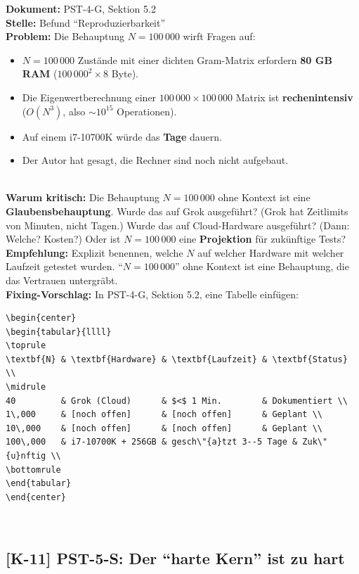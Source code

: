 \documentclass[11pt,a4paper]{article}
\newcommand{\K}[1]{\textbf{[K-#1]}}
\newcommand{\Dok}[1]{\textbf{Dokument:} #1\\}
\newcommand{\Stelle}[1]{\textbf{Stelle:} #1\\}
\newcommand{\Prob}[1]{\textbf{Problem:} #1\\}
\newcommand{\Krit}[1]{\textbf{Warum kritisch:} #1\\}
\newcommand{\Empf}[1]{\textbf{Empfehlung:} #1\\}
\newcommand{\Fix}[1]{\textbf{Fixing-Vorschlag:} #1\\}
\begin{document}
\Dok{PST-4-G, Sektion 5.2}
\Stelle{Befund ``Reproduzierbarkeit''}
\Prob{Die Behauptung $N = 100\,000$ wirft Fragen auf:
\begin{itemize}
  \item $N = 100\,000$ Zust\"{a}nde mit einer dichten Gram-Matrix
    erfordern \textbf{80 GB RAM} ($100\,000^2 \times 8$ Byte).
  \item Die Eigenwertberechnung einer $100\,000 \times 100\,000$
    Matrix ist \textbf{rechenintensiv} ($O(N^3)$, also $\sim 10^{15}$
    Operationen).
  \item Auf einem i7-10700K w\"{u}rde das \textbf{Tage} dauern.
  \item Der Autor hat gesagt, die Rechner sind noch nicht aufgebaut.
\end{itemize}}
\Krit{Die Behauptung $N = 100\,000$ ohne Kontext ist eine
\textbf{Glaubensbehauptung}. Wurde das auf Grok ausgef\"{u}hrt? (Grok
hat Zeitlimits von Minuten, nicht Tagen.) Wurde das auf Cloud-Hardware
ausgef\"{u}hrt? (Dann: Welche? Kosten?) Oder ist $N = 100\,000$ eine
\textbf{Projektion} f\"{u}r zuk\"{u}nftige Tests?}
\Empf{Explizit benennen, welche $N$ auf welcher Hardware mit welcher
Laufzeit getestet wurden. ``$N = 100\,000$'' ohne Kontext ist eine
Behauptung, die das Vertrauen untergr\"{a}bt.}
\Fix{In PST-4-G, Sektion 5.2, eine Tabelle einf\"{u}gen:
\begin{verbatim}
\begin{center}
\begin{tabular}{llll}
\toprule
\textbf{N} & \textbf{Hardware} & \textbf{Laufzeit} & \textbf{Status} \\
\midrule
40         & Grok (Cloud)      & $<$ 1 Min.        & Dokumentiert \\
1\,000     & [noch offen]      & [noch offen]      & Geplant \\
10\,000    & [noch offen]      & [noch offen]      & Geplant \\
100\,000   & i7-10700K + 256GB & gesch\"{a}tzt 3--5 Tage & Zuk\"{u}nftig \\
\bottomrule
\end{tabular}
\end{center}
\end{verbatim}}

\subsection{\K{11} PST-5-S: Der ``harte Kern'' ist zu hart}
\end{document}
